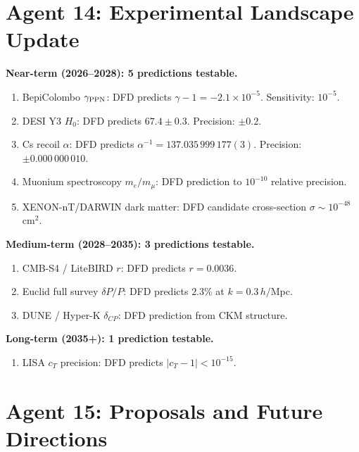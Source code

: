 \documentclass[11pt,a4paper]{article}
\begin{document}
\section{Agent 14: Experimental Landscape Update}

\begin{tcolorbox}[colback=green!5!white, colframe=dfdgreen, title=\textbf{DFD PREDICTIONS vs.\ EXPERIMENTAL TIMELINE}]

\textbf{Near-term (2026--2028): 5 predictions testable.}
\begin{enumerate}[nosep]
\item BepiColombo $\gamma_{\rm PPN}$: DFD predicts $\gamma - 1 = -2.1 \times 10^{-5}$. Sensitivity: $10^{-5}$.
\item DESI Y3 $H_0$: DFD predicts $67.4 \pm 0.3$. Precision: $\pm 0.2$.
\item Cs recoil $\alpha$: DFD predicts $\alpha^{-1} = 137.035\,999\,177(3)$. Precision: $\pm 0.000\,000\,010$.
\item Muonium spectroscopy $m_e/m_\mu$: DFD prediction to $10^{-10}$ relative precision.
\item XENON-nT/DARWIN dark matter: DFD candidate cross-section $\sigma \sim 10^{-48}$ cm$^2$.
\end{enumerate}

\textbf{Medium-term (2028--2035): 3 predictions testable.}
\begin{enumerate}[nosep]
\item CMB-S4 / LiteBIRD $r$: DFD predicts $r = 0.0036$.
\item Euclid full survey $\delta P/P$: DFD predicts $2.3\%$ at $k = 0.3\,h/$Mpc.
\item DUNE / Hyper-K $\delta_{CP}$: DFD prediction from CKM structure.
\end{enumerate}

\textbf{Long-term (2035+): 1 prediction testable.}
\begin{enumerate}[nosep]
\item LISA $c_T$ precision: DFD predicts $|c_T - 1| < 10^{-15}$.
\end{enumerate}
\end{tcolorbox}

\section{Agent 15: Proposals and Future Directions}
\end{document}
